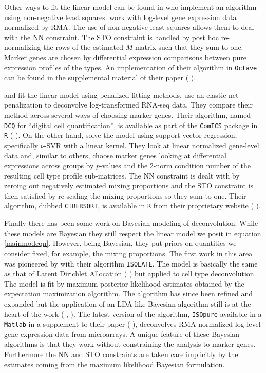\documentclass[reqno,12pt,oneside]{report}\usepackage[]{graphicx}\usepackage[]{color}
\renewcommand{\citet}[1]{(\citeauthor{#1} \citeyear{#1})}
\theoremstyle{plain}
\theoremstyle{definition}
\theoremstyle{remark}
\numberwithin{theorem}{chapter}     %
\begin{document}
Other ways to fit the linear model can be found in \cite{Qiao2012} who implement an algorithm using non-negative least squares. \cite{Qiao2012} work with log-level gene expression data normalized by RMA. The use of non-negative least squares allows them to deal with the NN constraint. The STO constraint is handled by post hoc re-normalizing the rows of the estimated $M$ matrix such that they sum to one. Marker genes are chosen by differential expression comparisons between pure expression profiles of the types. An implementation of their algorithm in \verb+Octave+ can be found in the supplemental material of their paper \citet{Qiao2012}. 

\cite{Newman2015} and \cite{Altboum2014} fit the linear model using penalized fitting methods. \citeauthor{Altboum2014} use an elastic-net penalization to deconvolve log-transformed RNA-seq data. They compare their method across several ways of choosing marker genes. Their algorithm, named \verb+DCQ+ for ``digital cell quantification'',  is available as part of the \verb+ComICS+ package in \verb+R+ \citet{ComICS2016}. On the other hand, \citeauthor{Newman2015} solve the model using support vector regression, specifically $\nu$-SVR with a linear kernel. They look at linear normalized gene-level data and, similar to others, choose marker genes looking at differential expressions across groups by $p$-values and the 2-norm condition number of the resulting cell type profile sub-matrices. The NN constraint is dealt with by zeroing out negatively estimated mixing proportions and the STO constraint is then satisfied by re-scaling the mixing proportions so they sum to one. Their algorithm, dubbed \verb+CIBERSORT+, is available in \verb+R+ from their proprietary website \citet{Newman2015}.

Finally there has been some work on Bayesian modeling of deconvolution. While these models are Bayesian they still respect the linear model we posit in equation \ref{mainmodeqn}. However, being Bayesian, they put priors on quantities we consider fixed, for example, the mixing proportions. The first work in this area was pioneered by \cite{Quon2009} with their algorithm \verb+ISOLATE+. The model is basically the same as that of Latent Dirichlet Allocation \citet{Blei2003} but applied to cell type deconvolution. The model is fit by  maximum posterior likelihood estimates obtained by the expectation maximization algorithm. The algorithm has since been refined and expanded but the application of an LDA-like Bayesian algorithm still is at the heart of the work (\citeauthor{Qiao2012} \citeyear{Qiao2012}, \citeauthor{Quon2013} \citeyear{Quon2013}). The latest version of the algorithm, \verb+ISOpure+ available in a \verb+Matlab+ in a supplement to their paper \citet{Quon2013}, deconvolves RMA-normalized log-level gene expression data from microarrays. A unique feature of these Bayesian algorithms is that they work without constraining the analysis to marker genes. Furthermore the NN and STO constraints are taken care implicitly by the estimates coming from the maximum likelihood Bayesian formulation.
\end{document}
